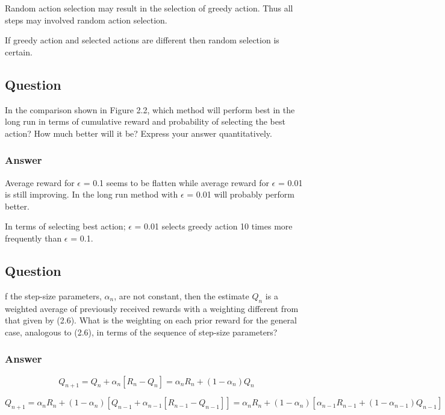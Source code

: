 \documentclass{article}
\begin{document}
    Random action selection may result in the selection of greedy action. Thus all steps may involved random action selection.

    If greedy action and selected actions are different then random selection is certain.

    \subsection{Question}

    In the comparison shown in Figure 2.2, which method will perform best in the long run in
    terms of cumulative reward and probability of selecting the best action? How much better will it be?
    Express your answer quantitatively.

    \subsubsection*{Answer}

    Average reward for \(\epsilon\) = 0.1 seems to be flatten while average reward for \(\epsilon\) = 0.01 is still improving. In the long run method with \(\epsilon\) = 0.01 will probably perform better.

    In terms of selecting best action; \(\epsilon\) = 0.01 selects greedy action 10 times more frequently than \(\epsilon\) = 0.1.

    \subsection{Question}
    f the step-size parameters, \(\alpha_n\), are not constant, then the estimate \(Q_n\) is a weighted
    average of previously received rewards with a weighting different from that given by (2.6). What is
    the weighting on each prior reward for the general case, analogous to (2.6), in terms of the sequence of
    step-size parameters?

    \subsubsection*{Answer}

    \begin{equation}
        Q_{n+1}=Q_{n}+\alpha_{n}[R_n-Q_n]=\alpha_{n}R_n+(1-\alpha_{n})Q_n
    \end{equation}

    \begin{equation}
        Q_{n+1}=\alpha_{n}R_n+(1-\alpha_{n})[Q_{n-1}+\alpha_{n-1}[R_{n-1}-Q_{n-1}]]=\alpha_{n}R_n+(1-\alpha_{n})[\alpha_{n-1}R_{n-1}+(1-\alpha_{n-1})Q_{n-1}]
    \end{equation}
\end{document}
